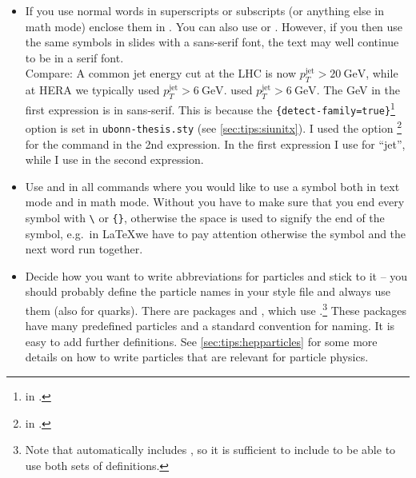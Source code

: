 \begin{itemize}
\item If you use normal words in superscripts or subscripts (or
  anything else in math mode) enclose them in . You can
  also use  or . However, if you then use
  the same symbols in slides with a sans-serif font, the text may well
  continue to be in a
  serif font.\\
  {\sffamily Compare: A common jet energy cut at the LHC is now
    $p_{T}^{\text{jet}} > \SI{20}{\GeV}$, while at HERA we typically
     {%
      used $p_{T}^{\mathrm{jet}} > \SI[obeyfamily=false]{6}{\GeV}$.
    }{%
      used $p_{T}^{\mathrm{jet}} > \SI[detect-family=false]{6}{\GeV}$.
    }}
  The \si{\GeV} in the first expression is in sans-serif. This is
  because the
  \texttt{\{detect-family=true\}}\footnote{
    in .} option is set in \texttt{ubonn-thesis.sty}
  (see \cref{sec:tips:siunitx}).  I used the option
  \footnote{ in .} for the  command in the 2nd expression.
  In the first expression I use  for \enquote{jet}, while
  I use  in the second expression.
  
\item Use  and
   in all commands where you would
  like to use a symbol both in text mode and in math mode. Without
   you have to make sure that you end every symbol with
  \texttt{\textbackslash} or \texttt{\{\}}, otherwise the space is used
  to signify the end of the symbol, e.g.\ in \LaTeX we have to pay
  attention otherwise the symbol and the next word run together.

\item Decide how you want to write abbreviations for particles and
  stick to it -- you should probably define the particle names in your
  style file and always use them (also for quarks).
  There are packages  and ,
  which use .\footnote{%
    Note that  automatically includes ,
    so it is sufficient to include  to be able to use both sets of definitions.}
  These packages have many predefined particles and a standard convention for naming.
  It is easy to add further definitions.
  See \cref{sec:tips:hepparticles} for some more details on how to write particles
  that are relevant for particle physics.


\end{itemize}
